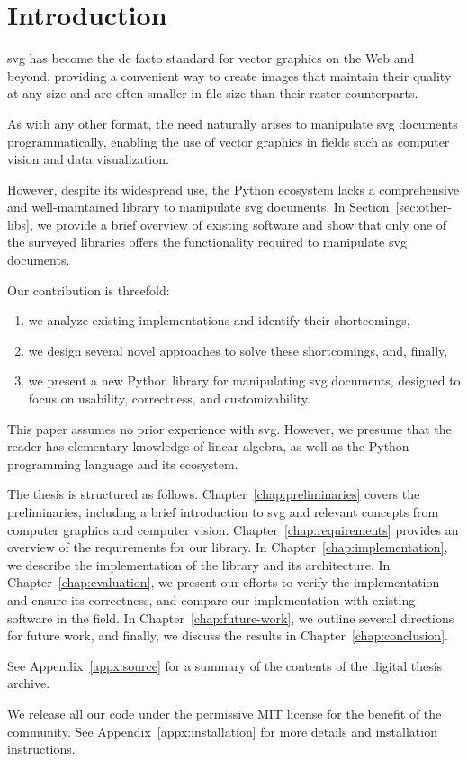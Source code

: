 \chapter{Introduction}\label{chap:introduction}

\gls{svg} has become the de facto standard for vector graphics on the Web and beyond, providing a convenient way to create images that maintain their quality at any size and are often smaller in file size than their raster counterparts.

As with any other format, the need naturally arises to manipulate \gls{svg} documents programmatically, enabling the use of vector graphics in fields such as computer vision and data visualization.

However, despite its widespread use, the Python ecosystem lacks a comprehensive and well-maintained library to manipulate \gls{svg} documents. In Section~\ref{sec:other-libs}, we provide a brief overview of existing software and show that only one of the surveyed libraries offers the functionality required to manipulate \gls{svg} documents.

Our contribution is threefold:
\begin{enumerate}
    \item we analyze existing implementations and identify their shortcomings,
    \item we design several novel approaches to solve these shortcomings, and, finally,
    \item we present a new Python library for manipulating \gls{svg} documents, designed to focus on usability, correctness, and customizability.
\end{enumerate}

This paper assumes no prior experience with \gls{svg}. However, we presume that the reader has elementary knowledge of linear algebra, as well as the Python programming language and its ecosystem.

The thesis is structured as follows. Chapter~\ref{chap:preliminaries} covers the preliminaries, including a brief introduction to \gls{svg} and relevant concepts from computer graphics and computer vision. Chapter~\ref{chap:requirements} provides an overview of the requirements for our library. In Chapter~\ref{chap:implementation}, we describe the implementation of the library and its architecture. In Chapter~\ref{chap:evaluation}, we present our efforts to verify the implementation and ensure its correctness, and compare our implementation with existing software in the field. In Chapter~\ref{chap:future-work}, we outline several directions for future work, and finally, we discuss the results in Chapter~\ref{chap:conclusion}.

See Appendix~\ref{appx:source} for a summary of the contents of the digital thesis archive.

We release all our code under the permissive MIT license for the benefit of the community. See Appendix~\ref{appx:installation} for more details and installation instructions.
